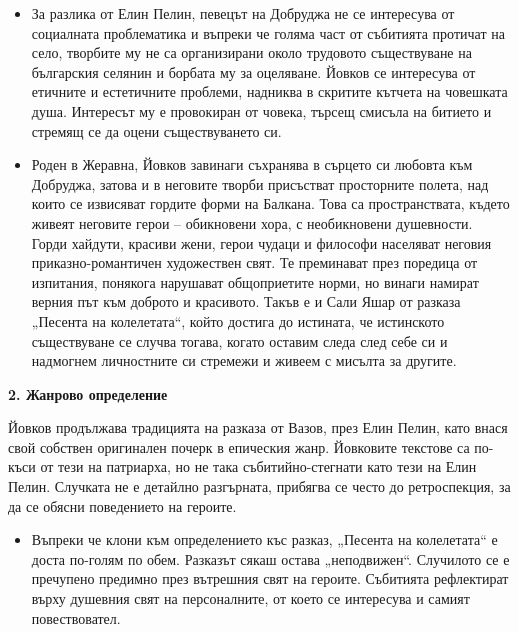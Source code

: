 \documentclass[12pt,a4paper]{article}
\begin{document}
\begin{itemize}[leftmargin=*, noitemsep, topsep=2pt, parsep=0pt]
    \item За разлика от Елин Пелин, певецът на Добруджа не се интересува от социалната проблематика и въпреки че голяма част от събитията протичат на село, творбите му не са организирани около трудовото съществуване на българския селянин и борбата му за оцеляване. Йовков се интересува от етичните и естетичните проблеми, надниква в скритите кътчета на човешката душа. Интересът му е провокиран от човека, търсещ смисъла на битието и стремящ се да оцени съществуването си.
    \item Роден в Жеравна, Йовков завинаги съхранява в сърцето си любовта към Добруджа, затова и в неговите творби присъстват просторните полета, над които се извисяват гордите форми на Балкана. Това са пространствата, където живеят неговите герои – обикновени хора, с необикновени душевности. Горди хайдути, красиви жени, герои чудаци и философи населяват неговия приказно-романтичен художествен свят. Те преминават през поредица от изпитания, понякога нарушават общоприетите норми, но винаги намират верния път към доброто и красивото. Такъв е и Сали Яшар от разказа „Песента на колелетата“, който достига до истината, че истинското съществуване се случва тогава, когато оставим следа след себе си и надмогнем личностните си стремежи и живеем с мисълта за другите.
\end{itemize}

\vspace{0.1cm}

\textbf{2. Жанрово определение}
\vspace{0.1cm} 

\indent Йовков продължава традицията на разказа от Вазов, през Елин Пелин, като внася свой собствен оригинален почерк в епическия жанр. Йовковите текстове са по-къси от тези на патриарха, но не така събитийно-стегнати като тези на Елин Пелин. Случката не е детайлно разгърната, прибягва се често до ретроспекция, за да се обясни поведението на героите.

\begin{itemize}[leftmargin=*, noitemsep, topsep=2pt, parsep=0pt]
    \item Въпреки че клони към определението къс разказ, „Песента на колелетата“ е доста по-голям по обем. Разказът сякаш остава „неподвижен“. Случилото се е пречупено предимно през вътрешния свят на героите. Събитията рефлектират върху душевния свят на персоналните, от което се интересува и самият повествовател.
\end{itemize}
\end{document}
